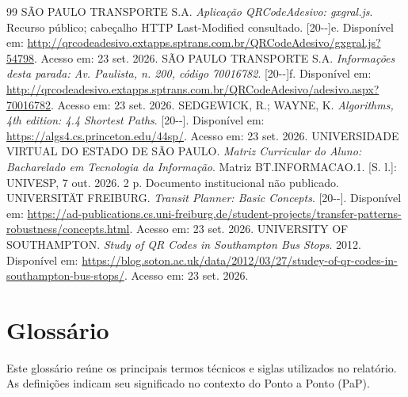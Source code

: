 \documentclass[12pt,oneside,a4paper,brazil,chapter=TITLE]{abntex2}
\begin{document}
\begin{thebibliography}{99}
 SÃO PAULO TRANSPORTE S.A. \textit{Aplicação QRCodeAdesivo: gxgral.js}. Recurso público; cabeçalho HTTP Last-Modified consultado. [20\mbox{-}\mbox{-}]e. Disponível em: \url{http://qrcodeadesivo.extapps.sptrans.com.br/QRCodeAdesivo/gxgral.js?54798}. Acesso em: 23 set. 2026.
 SÃO PAULO TRANSPORTE S.A. \textit{Informações desta parada: Av. Paulista, n. 200, código 70016782}. [20\mbox{-}\mbox{-}]f. Disponível em: \url{http://qrcodeadesivo.extapps.sptrans.com.br/QRCodeAdesivo/adesivo.aspx?70016782}. Acesso em: 23 set. 2026.
 SEDGEWICK, R.; WAYNE, K. \textit{Algorithms, 4th edition: 4.4 Shortest Paths}. [20\mbox{-}\mbox{-}]. Disponível em: \url{https://algs4.cs.princeton.edu/44sp/}. Acesso em: 23 set. 2026.
 UNIVERSIDADE VIRTUAL DO ESTADO DE SÃO PAULO. \textit{Matriz Curricular do Aluno: Bacharelado em Tecnologia da Informação}. Matriz BT.INFORMACAO.1. [S. l.]: UNIVESP, 7 out. 2026. 2 p. Documento institucional não publicado.
 UNIVERSITÄT FREIBURG. \textit{Transit Planner: Basic Concepts}. [20\mbox{-}\mbox{-}]. Disponível em: \url{https://ad-publications.cs.uni-freiburg.de/student-projects/transfer-patterns-robustness/concepts.html}. Acesso em: 23 set. 2026.
 UNIVERSITY OF SOUTHAMPTON. \textit{Study of QR Codes in Southampton Bus Stops}. 2012. Disponível em: \url{https://blog.soton.ac.uk/data/2012/03/27/studey-of-qr-codes-in-southampton-bus-stops/}. Acesso em: 23 set. 2026.
\end{thebibliography}


\chapter*{Glossário}
\label{sec:glossario}
Este glossário reúne os principais termos técnicos e siglas utilizados no relatório. As definições indicam seu significado no contexto do Ponto a Ponto (PaP).
\end{document}
